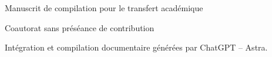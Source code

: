 \thispagestyle{plain}
\begin{center}
{\fontsize{10}{12}\selectfont Manuscrit de compilation pour le transfert académique\par}
\vspace{12mm}
{\fontsize{17}{20.5}\selectfont\bfseries\Titulo\par}
\vspace{6pt}
{\fontsize{11.5}{14}\selectfont\TituloSegundo\par}
\vspace{11pt}
{\fontsize{11.5}{14}\selectfont\Autores\par}
\vspace{4pt}
{\fontsize{8}{10}\selectfont Coautorat sans préséance de contribution\par}
\vspace{3pt}
{\fontsize{7.5}{9.5}\selectfont Intégration et compilation documentaire générées par ChatGPT -- Astra.\par}
\end{center}
\vspace{7pt}
